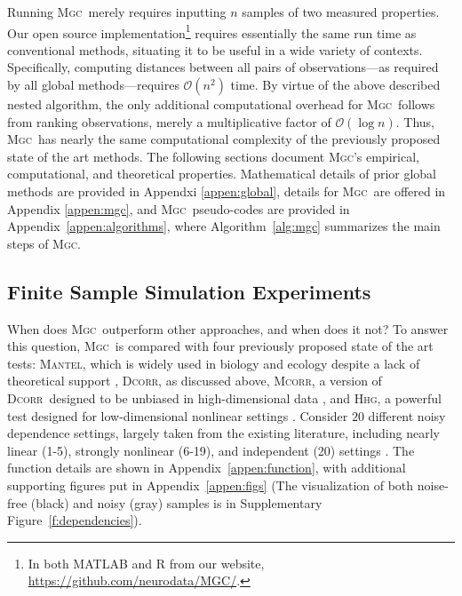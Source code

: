 \documentclass[11pt]{article}
\providecommand{\sct}[1]{{\normalfont\textsc{#1}}}
\providecommand{\mc}[1]{\mathcal{#1}}
\newcommand{\Mgc}{\sct{Mgc}}
\newcommand{\Hhg}{\sct{Hhg}}
\newcommand{\Dcorr}{\sct{Dcorr}}
\newcommand{\Mcorr}{\sct{Mcorr}}
\newcommand{\Mantel}{\sct{Mantel}}
\newcommand{\website}{\url{https://github.com/neurodata/MGC/}}
\begin{document}
Running \Mgc~merely requires inputting $n$ samples of two measured properties.  Our open source implementation\footnote{In both MATLAB and R from our website, \website.} requires essentially the same run time as conventional methods, situating it to be useful in a wide variety of contexts. Specifically, computing distances between all pairs of observations---as required by all global methods---requires $\mathcal{O}(n^2)$ time.  By virtue of the above described nested algorithm, the only additional computational overhead for \Mgc~follows from ranking observations, merely a multiplicative factor of $\mc{O}(\log n)$.  Thus, \Mgc~has nearly the same computational complexity of the previously proposed state of the art methods. The following sections document \Mgc's empirical, computational, and theoretical properties. Mathematical details of prior global methods are provided in Appendxi \ref{appen:global}, details for \Mgc~are offered in Appendix \ref{appen:mgc}, and \Mgc~pseudo-codes are provided in Appendix~\ref{appen:algorithms}, where Algorithm~\ref{alg:mgc} summarizes the main steps of \Mgc.



\subsection*{Finite Sample Simulation Experiments}

When does \Mgc~outperform other approaches, and when does it not?
To answer this question, \Mgc~is compared with four previously proposed state of the art tests: \Mantel, which is widely used in biology and ecology despite a lack of theoretical support \cite{Mantel1967}, \Dcorr, as discussed above, \Mcorr, a version of \Dcorr~designed to be unbiased in high-dimensional data \cite{SzekelyRizzo2013a}, and \Hhg, a powerful test designed for low-dimensional nonlinear settings \cite{HellerGorfine2013}. 
Consider $20$ different noisy dependence settings, largely taken from the existing literature, including  nearly linear (1-5), strongly nonlinear (6-19), and independent (20) settings \cite{SzekelyRizzoBakirov2007, SimonTibshirani2012, GorfineHellerHeller2012, HellerGorfine2013, SzekelyRizzo2013a}.  
The function details are shown in Appendix~\ref{appen:function}, with additional supporting figures put in Appendix~\ref{appen:figs} (The visualization of both noise-free (black) and noisy (gray) samples is in Supplementary Figure~\ref{f:dependencies}).  
\end{document}
